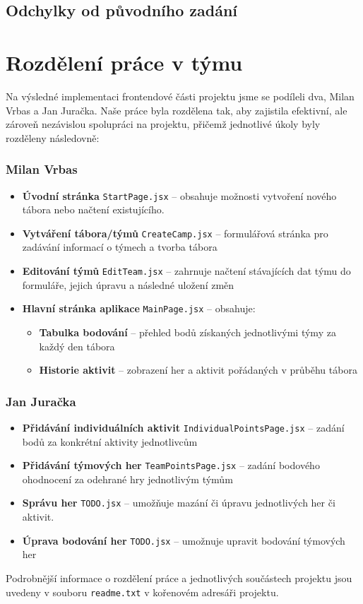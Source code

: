 \documentclass[a4paper, 12pt]{article} %
\begin{document}
\subsection{Odchylky od původního zadání}

\section{Rozdělení práce v týmu}

Na výsledné implementaci frontendové části projektu jsme se podíleli dva, Milan Vrbas a 
Jan Juračka. Naše práce byla rozdělena tak, aby zajistila efektivní, ale zároveň nezávislou 
spolupráci na projektu, přičemž jednotlivé úkoly byly rozděleny následovně:

\subsubsection*{Milan Vrbas}
\begin{itemize}
    \item \textbf{Úvodní stránka} \texttt{StartPage.jsx} -- obsahuje možnosti vytvoření nového 
        tábora nebo načtení existujícího.
    \item \textbf{Vytváření tábora/týmů} \texttt{CreateCamp.jsx} -- formulářová stránka pro 
        zadávání informací o týmech a tvorba tábora
    \item \textbf{Editování týmů} \texttt{EditTeam.jsx} -- zahrnuje načtení stávajících dat 
        týmu do formuláře, jejich úpravu a následné uložení změn
    \item \textbf{Hlavní stránka aplikace} \texttt{MainPage.jsx} -- obsahuje:
    \begin{itemize}
        \item \textbf{Tabulka bodování} -- přehled bodů získaných jednotlivými týmy za každý 
            den tábora
        \item \textbf{Historie aktivit} -- zobrazení her a aktivit pořádaných v průběhu tábora
    \end{itemize}
\end{itemize}

\subsubsection*{Jan Juračka}
\begin{itemize}
    \item \textbf{Přidávání individuálních aktivit} \texttt{IndividualPointsPage.jsx} -- 
        zadání bodů za konkrétní aktivity jednotlivcům
    \item \textbf{Přidávání týmových her} \texttt{TeamPointsPage.jsx} -- zadání bodového 
        ohodnocení za odehrané hry jednotlivým týmům
    \item \textbf{Správu her} \texttt{TODO.jsx} -- umožňuje mazání či úpravu jednotlivých her 
        či aktivit.
    \item \textbf{Úprava bodování her} \texttt{TODO.jsx} -- umožnuje upravit bodování týmových her
\end{itemize}
Podrobnější informace o rozdělení práce a jednotlivých součástech projektu jsou uvedeny v 
souboru \texttt{readme.txt} v kořenovém adresáři projektu.
\end{document}
